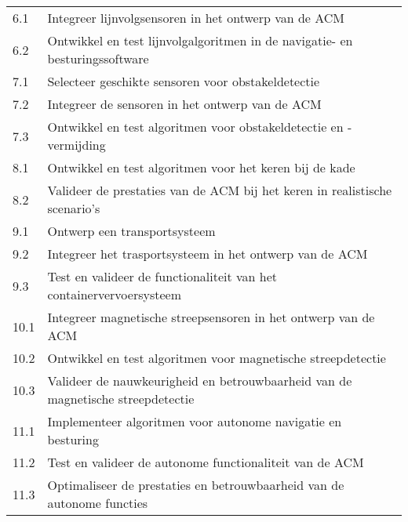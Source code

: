 \begin{longtable}{@{}ll@{}}
    6.1        & Integreer lijnvolgsensoren in het ontwerp van de ACM                                               \\
    6.2        & Ontwikkel en test lijnvolgalgoritmen in de navigatie- en besturingssoftware                        \\

    7.1        & Selecteer geschikte sensoren voor obstakeldetectie                                                 \\
    7.2        & Integreer de sensoren in het ontwerp van de ACM                                                    \\
    7.3        & Ontwikkel en test algoritmen voor obstakeldetectie en -vermijding                                  \\

    8.1        & Ontwikkel en test algoritmen voor het keren bij de kade                                            \\
    8.2        & Valideer de prestaties van de ACM bij het keren in realistische scenario's                         \\

    9.1        & Ontwerp een transportsysteem                                                                       \\
    9.2        & Integreer het trasportsysteem in het ontwerp van de ACM                                            \\
    9.3        & Test en valideer de functionaliteit van het containervervoersysteem                                \\

    10.1       & Integreer magnetische streepsensoren in het ontwerp van de ACM                                     \\
    10.2       & Ontwikkel en test algoritmen voor magnetische streepdetectie                                       \\
    10.3       & Valideer de nauwkeurigheid en betrouwbaarheid van de magnetische streepdetectie                    \\

    11.1       & Implementeer algoritmen voor autonome navigatie en besturing                                       \\
    11.2       & Test en valideer de autonome functionaliteit van de ACM                                            \\
    11.3       & Optimaliseer de prestaties en betrouwbaarheid van de autonome functies                             \\


\end{longtable}

